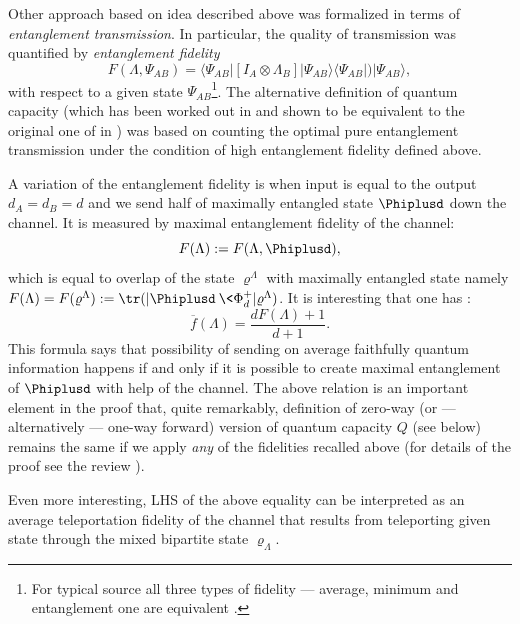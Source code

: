 \documentclass[rmp,12pt,preprint]{revtex4-2}
\begin{document}
Other approach based on idea described above was formalized in
terms of {\it entanglement transmission}. In particular, the
quality of transmission was quantified by {\it entanglement fidelity}
\begin{equation}
F(\Lambda,\Psi_{AB})=\langle \Psi_{AB}| [I_{A} \otimes
\Lambda_{B}]|\Psi_{AB}\rangle \langle \Psi_{AB}|)| \Psi_{AB} \rangle,
\end{equation}
with respect to a given state $\Psi_{AB}$\footnote{For typical
source all three types of fidelity --- average, minimum and entanglement one
are equivalent \cite{BarnumKN-cap-equiv}.}.
The alternative
definition of quantum capacity (which has been worked out in
\cite{Schumach96PRA,SchumacherN-1996-pra,BarnSchumachNiels98PRA} and
shown to be equivalent to the original one of \cite{BDSW1996,BennettDS97-cap}
in \cite{BarnumKN-cap-equiv}) was based on counting the optimal pure
entanglement transmission under the condition of high entanglement
fidelity defined above.

A variation of the entanglement fidelity
\cite{ReimpellWerner} is when input is equal to the output
$d_{A}=d_{B}=d$ and we send half of maximally entangled state
$\Phiplusd$  down the channel. It is measured by maximal entanglement
fidelity of the channel:
\begin{equation}
F(\Lambda):=F(\Lambda,\Phiplusd),
\end{equation}
which is equal to overlap of the state $\varrho^{\Lambda}$ with
maximally entangled state namely
$F(\Lambda)=F(\varrho^{\Lambda}):={\tr}(|\Phiplusd\>\<\Phi^+_d|\varrho^{\Lambda})$. It is
interesting that one has \cite{gentele,NielsenFidelity}:
\begin{equation}
\overline{f}(\Lambda)=\frac{dF(\Lambda) + 1}{d+1}.
\label{GeneralFidelity}
\end{equation}
This formula says that possibility of sending on average faithfully
quantum information happens if and only if  it is possible to create
maximal entanglement of $\Phiplusd$ with help of the channel. The above
relation is an important element in the proof that, quite
remarkably, definition of zero-way (or --- alternatively --- one-way
forward) version of quantum capacity $Q$ (see below) remains the
same if we apply {\it any} of the fidelities recalled above (for details
of the proof see the review \cite{Tema}).

Even more interesting, LHS
of the above equality can be interpreted as an average
teleportation fidelity of the channel that results from teleporting
given state through the mixed bipartite state $\varrho_{\Lambda}$.
\end{document}
